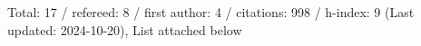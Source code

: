 Total: 17 / refereed: 8 / first author: 4 / citations: 998 / h-index: 9 (Last updated: 2024-10-20), List attached below